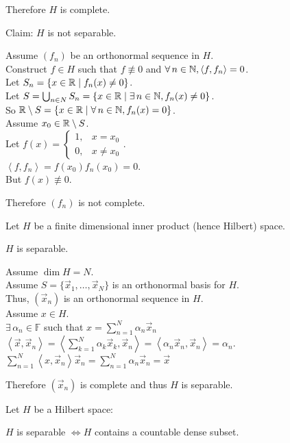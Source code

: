 \documentclass[letterpaper,12pt,fleqn]{article}
\newcommand{\vx}{\vec{x}}
\newcommand{\inner}[1]{\left<#1\right>}
\newcommand{\F}{\mathbb{F}}
\renewcommand{\a}{\alpha}
\begin{document}
\begin{examples}
\begin{enumerate}
    Therefore $H$ is complete.
    
    Claim: $H$ is not separable.

    Assume $(f_n)$ be an orthonormal sequence in $H$. \\
    Construct $f\in H$ such that $f\not\equiv0$ and
    $\forall\,n\in\N,\inner{f,f_n}=0$. \\
    Let $S_n=\{x\in\mathbb{R}\mid f_n(x)\ne0\}$. \\
    Let $S=\bigcup_{n\in N}S_n=\{x\in\mathbb{R}\mid\exists\,n\in\mathbb{N},f_n(x)\ne0\}$. \\
    So $\mathbb{R}\setminus S=\{x\in\mathbb{R}\mid\forall\,n\in\mathbb{N},f_n(x)=0\}$. \\
    Assume $x_0\in\mathbb{R}\setminus S$. \\
    Let $f(x)=\begin{cases}1, & x=x_0 \\ 0, & x\ne x_0\end{cases}$. \\
    $\inner{f,f_n}=f(x_0)f_n(x_0)=0$. \\
    But $f(x)\not\equiv0$.

    Therefore $(f_n)$ is not complete.
  \end{enumerate}
\end{examples}

\begin{theorem}
  Let $H$ be a finite dimensional inner product (hence Hilbert) space.

  \qquad$H$ is separable.
\end{theorem}

\begin{theproof}
  Assume $\dim H=N$. \\
  Assume $S=\{\vx_1,\ldots,\vx_N\}$ is an orthonormal basis for $H$. \\
  Thus, $(\vx_n)$ is an orthonormal sequence in $H$. \\
  Assume $x\in H$. \\
  $\exists\,\a_n\in\F$ such that $x=\sum_{n=1}^N\a_n\vx_n$ \\
  $\inner{\vx,\vx_n}=\inner{\sum_{k=1}^N\a_k\vx_k,\vx_n}=\inner{\a_n\vx_n,\vx_n}=
  \a_n$. \\
  $\sum_{n=1}^N\inner{x,\vx_n}\vx_n=\sum_{n=1}^N\a_n\vx_n=\vx$

  Therefore $(\vx_n)$ is complete and thus $H$ is separable.
\end{theproof}

\begin{theorem}
  Let $H$ be a Hilbert space:

  \qquad$H$ is separable $\iff H$ contains a countable dense subset.
\end{theorem}
\end{document}
